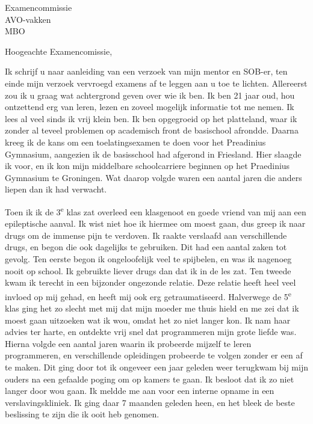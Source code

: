 \documentclass{letter}
\begin{document}
\begin{letter}{Examencommissie \\ AVO-vakken \\ MBO}
\opening{Hoogeachte Examencomissie,}

Ik schrijf u naar aanleiding van een verzoek van mijn mentor en SOB-er, ten einde mijn
verzoek vervroegd examens af te leggen aan u toe te lichten.
Allereerst zou ik u graag wat achtergrond geven over wie ik ben.
Ik ben 21 jaar oud, hou ontzettend erg van leren, lezen en zoveel mogelijk informatie
tot me nemen. Ik lees al veel sinds ik vrij klein ben.
Ik ben opgegroeid op het platteland, waar ik zonder al teveel problemen op academisch front
de basischool afrondde. Daarna kreeg ik de kans om een toelatingsexamen te doen
voor het Preadinius Gymnasium, aangezien ik de basisschool had afgerond in Friesland. 
Hier slaagde ik voor, en ik kon mijn middelbare schoolcarriere beginnen op het Praedinius
Gymnasium te Groningen. Wat daarop volgde waren een aantal jaren die anders liepen dan ik
had verwacht.

Toen ik ik de 3\textsuperscript{e} klas zat overleed een klasgenoot en goede vriend van mij aan
een epileptische aanval. Ik wist niet hoe ik hiermee om moest gaan, dus greep ik naar drugs om
de immense pijn te verdoven. Ik raakte verslaafd aan verschillende drugs, en 
begon die ook dagelijks te gebruiken. Dit had een aantal zaken tot gevolg. Ten eerste begon ik 
ongeloofelijk veel te spijbelen, en was ik nagenoeg nooit op school. Ik gebruikte liever drugs 
dan dat ik in de les zat. Ten tweede kwam ik terecht in een bijzonder ongezonde relatie. 
Deze relatie heeft heel veel invloed op mij gehad,
en heeft mij ook erg getraumatiseerd. Halverwege de 5\textsuperscript{e} klas ging het zo slecht
met mij dat mijn moeder me thuis hield en me zei dat ik moest gaan uitzoeken wat ik wou, omdat het
zo niet langer kon. Ik nam haar advies ter harte, en ontdekte vrij snel dat programmeren mijn grote
liefde was. Hierna volgde een aantal jaren waarin ik probeerde mijzelf te leren programmeren, en 
verschillende opleidingen probeerde te volgen zonder er een af te maken. Dit ging door tot ik ongeveer
een jaar geleden weer terugkwam bij mijn ouders na een gefaalde poging om op kamers te gaan. 
Ik besloot dat ik zo niet langer door wou gaan. Ik meldde me aan voor een interne opname in een 
verslavingskliniek. Ik ging daar 7 maanden geleden heen, en het bleek de beste beslissing te zijn 
die ik ooit heb genomen.


\end{letter}
\end{document}

